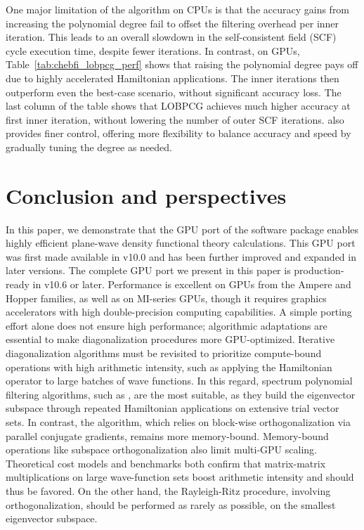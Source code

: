 \documentclass[twocolumn,superscriptaddress]{revtex4-1}
\begin{document}
One major limitation of the \chebyshevfiltering algorithm on CPUs is that the accuracy gains from increasing the polynomial degree fail to offset the filtering overhead per inner iteration. This leads to an overall slowdown in the self-consistent field (SCF) cycle execution time, despite fewer iterations.
In contrast, on GPUs, Table~\ref{tab:chebfi_lobpcg_perf} shows that raising the polynomial degree pays off due to highly accelerated Hamiltonian applications. The inner iterations then outperform even the best-case \lobpcg scenario, without significant accuracy loss. The last column of the table shows that LOBPCG achieves much higher accuracy at first inner iteration, without lowering the number of outer SCF iterations. \chebyshevfiltering also provides finer control, offering more flexibility to balance accuracy and speed by gradually tuning the degree as needed.

\section{Conclusion and perspectives}

In this paper, we demonstrate that the GPU port of the \abinit software package enables highly efficient plane-wave density functional theory calculations. This GPU port was first made available in \abinit v10.0 and has been further improved and expanded in later versions. The complete GPU port we present in this paper is production-ready in \abinit v10.6 or later. Performance is excellent on \nvidia GPUs from the Ampere and Hopper families, as well as on \amd MI-series GPUs, though it requires graphics accelerators with high double-precision computing capabilities.
A simple porting effort alone does not ensure high performance; algorithmic adaptations are essential to make diagonalization procedures more GPU-optimized. Iterative diagonalization algorithms must be revisited to prioritize compute-bound operations with high arithmetic intensity, such as applying the Hamiltonian operator to large batches of wave functions.
In this regard, spectrum polynomial filtering algorithms, such as \chebyshevfiltering, are the most suitable, as they build the eigenvector subspace through repeated Hamiltonian applications on extensive trial vector sets. In contrast, the \lobpcg algorithm, which relies on block-wise orthogonalization via parallel conjugate gradients, remains more memory-bound.
Memory-bound operations like subspace orthogonalization also limit multi-GPU scaling. Theoretical cost models and \abinit benchmarks both confirm that matrix-matrix multiplications on large wave-function sets boost arithmetic intensity and should thus be favored. On the other hand, the Rayleigh-Ritz procedure, involving orthogonalization, should be performed as rarely as possible, on the smallest eigenvector subspace.
\end{document}
